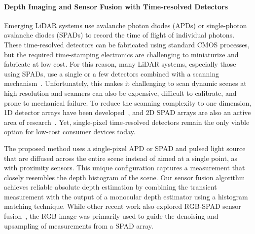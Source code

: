 \paragraph{Depth Imaging and Sensor Fusion with Time-resolved Detectors}
%
Emerging LiDAR systems use avalanche photon diodes (APDs) or single-photon avalanche diodes (SPADs)
to record the time of flight of individual photons. These time-resolved detectors can be
fabricated using standard CMOS processes, but the required time-stamping electronics are challenging to miniaturize and fabricate at low
cost. For this reason, many LiDAR systems, especially those using SPADs, use a single or a few detectors
combined with a  scanning
mechanism~\cite{Kirmani:2014,Lamb2010,Li:2019,pawlikowska2017single,gupta2019photonflooded}.
Unfortunately, this makes it challenging to scan dynamic scenes at high
resolution and scanners can also be expensive, difficult to calibrate, and prone
to mechanical failure. To reduce the scanning complexity to one dimension, 1D
detector arrays have been
developed~\cite{burri2017linospad,burri2016linospad,OToole2017}, and 2D SPAD arrays are also an active area of
research~\cite{Niclass2005,Stoppa2007,Veerappan2011,Zhang2018}. Yet,
single-pixel time-resolved detectors remain the only viable option for low-cost consumer devices
today.


The proposed method uses a single-pixel APD or SPAD and pulsed light source that are
diffused across the entire scene instead of aimed at a single point, as with
proximity sensors. This unique configuration captures a measurement that closely
resembles the depth histogram of the scene. Our sensor fusion algorithm achieves
reliable absolute depth estimation by combining the transient measurement with the
output of a monocular depth estimator using a histogram matching technique.
While other recent work also explored RGB-SPAD sensor fusion~\cite{Lindell2018},
the RGB image was primarily used to guide the denoising and upsampling of
measurements from a SPAD array.

 


